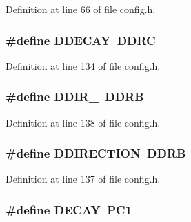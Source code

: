 Definition at line 66 of file config.\-h.

\hypertarget{group__biba__config_ga4280725e4eff1145eac3e34c574b8383}{
\subsubsection[{D\-D\-E\-C\-A\-Y}]{\setlength{\rightskip}{0pt plus 5cm}\#define D\-D\-E\-C\-A\-Y~D\-D\-R\-C}}\label{group__biba__config_ga4280725e4eff1145eac3e34c574b8383}


Definition at line 134 of file config.\-h.

\hypertarget{group__biba__config_gab2a611474dce8378023836a4c5e07b3a}{
\subsubsection[{D\-D\-I\-R\-\_\-485}]{\setlength{\rightskip}{0pt plus 5cm}\#define D\-D\-I\-R\-\_~D\-D\-R\-B}}\label{group__biba__config_gab2a611474dce8378023836a4c5e07b3a}


Definition at line 138 of file config.\-h.

\hypertarget{group__biba__config_ga75cfe7b50065d13aa41a1b28815b78df}{
\subsubsection[{D\-D\-I\-R\-E\-C\-T\-I\-O\-N}]{\setlength{\rightskip}{0pt plus 5cm}\#define D\-D\-I\-R\-E\-C\-T\-I\-O\-N~D\-D\-R\-B}}\label{group__biba__config_ga75cfe7b50065d13aa41a1b28815b78df}


Definition at line 137 of file config.\-h.

\hypertarget{group__biba__config_ga9d211c41bcae2aa62028a3645c63cf8a}{
\subsubsection[{D\-E\-C\-A\-Y}]{\setlength{\rightskip}{0pt plus 5cm}\#define D\-E\-C\-A\-Y~P\-C1}}\label{group__biba__config_ga9d211c41bcae2aa62028a3645c63cf8a}


